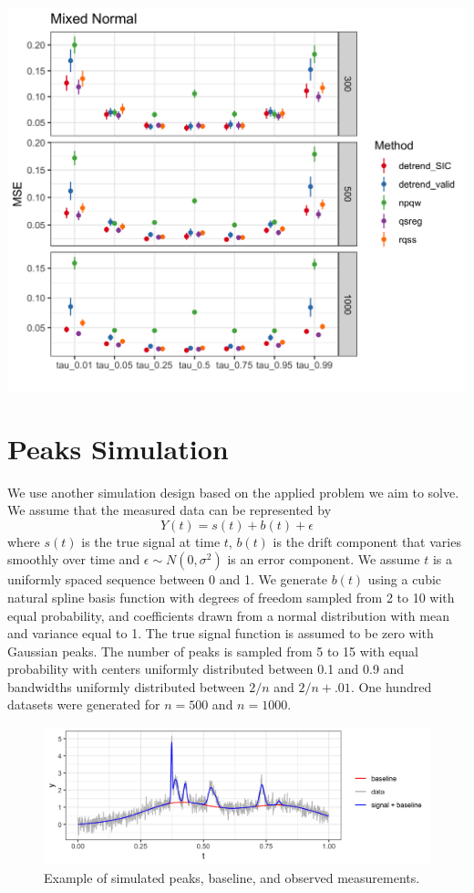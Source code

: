 \documentclass[]{article}
\begin{document}
\includegraphics[width=\linewidth]{Figures/mixednorm_mse.png}


\section{Peaks Simulation}
We use another simulation design based on the applied problem we aim to solve. We assume that the measured data can be represented by 
\begin{equation}
Y(t) = s(t) + b(t) + \epsilon
\end{equation} 
where $s(t)$ is the true signal at time $t$, $b(t)$ is the drift component that varies smoothly over time and $\epsilon \sim N(0, \sigma^2)$ is an error component. We assume $t$ is a uniformly spaced sequence between 0 and 1. We generate $b(t)$ using a cubic natural spline basis function with degrees of freedom sampled from 2 to 10 with equal probability, and coefficients drawn from a normal distribution with mean and variance equal to 1. The true signal function is assumed to be zero with Gaussian peaks. The number of peaks is sampled from 5 to 15 with equal probability with centers uniformly distributed between 0.1 and 0.9 and bandwidths uniformly distributed between $2/n$ and $2/n + .01$. One hundred datasets were generated for $n=500$ and $n=1000$. 

\begin{figure}
	\caption{Example of simulated peaks, baseline, and observed measurements.}
	\includegraphics[width = \linewidth]{Figures/ex_peaks.png}
\end{figure}
\end{document}
